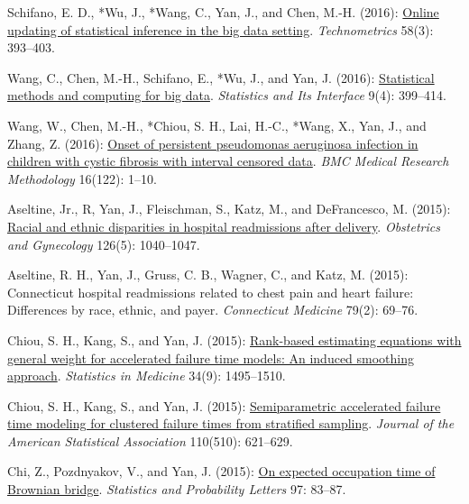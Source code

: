 \begin{RefereedJournalArticles}
\item Schifano, E. D., *Wu, J., *Wang, C., Yan, J.,
and Chen, M.-H. (2016):
\href{https://doi.org/10.1080/00401706.2016.1142900}{Online updating of
statistical inference in the big data setting}. \emph{Technometrics}
58(3): 393--403.

\item *Wang, C., Chen, M.-H., Schifano, E., *Wu, J.,
and Yan, J. (2016):
\href{https://doi.org/10.4310/SII.2016.v9.n4.a1}{Statistical methods and
computing for big data}. \emph{Statistics and Its Interface} 9(4):
399--414.

\item *Wang, W., Chen, M.-H., *Chiou, S. H., Lai,
H.-C., *Wang, X., Yan, J., and Zhang, Z. (2016):
\href{https://doi.org/10.1186/s12874-016-0220-5}{Onset of persistent
pseudomonas aeruginosa infection in children with cystic fibrosis with
interval censored data}. \emph{BMC Medical Research Methodology}
16(122): 1--10.

\item Aseltine, Jr., R, Yan, J., Fleischman, S., Katz, M., and DeFrancesco, M.
(2015): \href{https://doi.org/10.1097/aog.0000000000001090}{Racial and
ethnic disparities in hospital readmissions after delivery}.
\emph{Obstetrics and Gynecology} 126(5): 1040--1047.

\item Aseltine, R. H., Yan, J., Gruss, C. B., Wagner, C., and Katz, M. (2015):
Connecticut hospital readmissions related to chest pain and heart
failure: Differences by race, ethnic, and payer. \emph{Connecticut
Medicine} 79(2): 69--76.

\item *Chiou, S. H., Kang, S., and Yan, J. (2015):
\href{https://doi.org/10.1002/sim.6415}{Rank-based estimating equations
with general weight for accelerated failure time models: An induced
smoothing approach}. \emph{Statistics in Medicine} 34(9): 1495--1510.

\item *Chiou, S. H., Kang, S., and Yan, J. (2015):
\href{https://doi.org/10.1080/01621459.2014.917978}{Semiparametric
accelerated failure time modeling for clustered failure times from
stratified sampling}. \emph{Journal of the American Statistical
Association} 110(510): 621--629.

\item Chi, Z., Pozdnyakov, V., and Yan, J. (2015):
\href{https://doi.org/10.1016/j.spl.2014.11.009}{On expected occupation
time of Brownian bridge}. \emph{Statistics and Probability Letters} 97:
83--87.


\end{RefereedJournalArticles}
